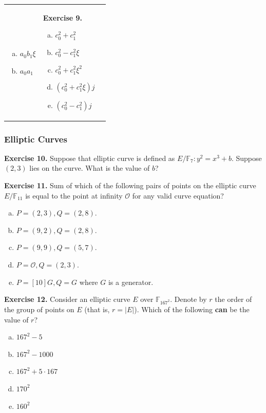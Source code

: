 \documentclass[../lecture-notes.tex]{subfiles}
\begin{document}
\begin{center}
\begin{tabular}{p{5cm}p{5cm}p{5cm}}
\begin{enumerate}[a)]
            \item $a_0b_1\xi$
            \item $a_0a_1$
        \end{enumerate} & 
        \textbf{Exercise 9.}
        \begin{enumerate}[a)]
            \item $c_0^2+c_1^2$
            \item $c_0^2-c_1^2\xi$
            \item $c_0^2+c_1^2\xi^2$
            \item $(c_0^2+c_1^2\xi)j$
            \item $(c_0^2-c_1^2)j$
        \end{enumerate} 
    \end{tabular}
\end{center}

\subsubsection*{Elliptic Curves}
\textbf{Exercise 10.} Suppose that elliptic curve is defined as $E/\mathbb{F}_{7}: y^2=x^3+b$. Suppose $(2,3)$ lies on the curve. What is the value of $b$?

\textbf{Exercise 11.} Sum of which of the following pairs of points on the elliptic curve $E/\mathbb{F}_{11}$ is equal to the point at infinity $\mathcal{O}$ for any valid curve equation?
\begin{enumerate}[a)]
    \item $P=(2,3),Q=(2,8)$.
    \item $P=(9,2),Q=(2,8)$.
    \item $P=(9,9),Q=(5,7)$.
    \item $P=\mathcal{O},Q=(2,3)$.
    \item $P=[10]G,Q=G$ where $G$ is a generator.
\end{enumerate}

\textbf{Exercise 12.} Consider an elliptic curve $E$ over $\mathbb{F}_{167^2}$. Denote by $r$ the order of the group of points on $E$ (that is, $r=|E|$). Which of the following \textbf{can} be the value of $r$?
\begin{enumerate}[a)]
    \item $167^2 - 5$
    \item $167^2-1000$
    \item $167^2+5 \cdot 167$
    \item $170^2$
    \item $160^2$
\end{enumerate}
\end{document}
